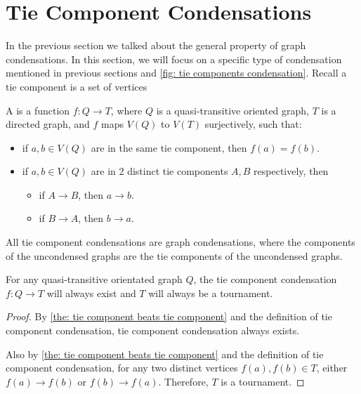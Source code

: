 \section{Tie Component Condensations}

In the previous section we talked about the general property
of graph condensations.
In this section, we will focus on a specific type of condensation
mentioned in previous sections and
\cref{fig: tie components condensation}.
Recall a tie component is a set of vertices

\begin{definition}
  A  is a
  function \(f: Q \to T\),
  where \(Q\) is a quasi-transitive oriented graph,
  \(T\) is a directed graph,
  and \(f\) maps \(V(Q)\) to \(V(T)\) surjectively,
  such that:
  \begin{itemize}
    \item if \(a, b \in V(Q)\) are in the same tie component,
      then \(f(a) = f(b)\).
    \item if \(a, b \in V(Q)\) are in 2 distinct tie components
      \(A, B\) respectively,
      then
      \begin{itemize}
        \item if \(A \to B\), then \(a \rightarrow b\).
        \item if \(B \to A\), then \(b \rightarrow a\).
      \end{itemize}
  \end{itemize}
\end{definition}

\begin{corollary}\label{the: tie condensation are condensation}
  All tie component condensations are graph condensations,
  where the components of the uncondensed graphs
  are the tie components of the uncondensed graphs.
\end{corollary}

\begin{corollary}\label{the: tie condensation results in tournament}
  For any quasi-transitive orientated graph \(Q\),
  the tie component condensation \(f: Q \to T\) will always exist
  and \(T\) will always be a tournament.
\end{corollary}
\begin{proof}
  By \cref{the: tie component beats tie component} and
  the definition of tie component condensation,
  tie component condensation always exists.

  Also by \cref{the: tie component beats tie component} and
  the definition of tie component condensation,
  for any two distinct vertices \(f(a), f(b) \in T\),
  either \(f(a) \to f(b)\) or \(f(b) \to f(a)\).
  Therefore, \(T\) is a tournament.
\end{proof}

